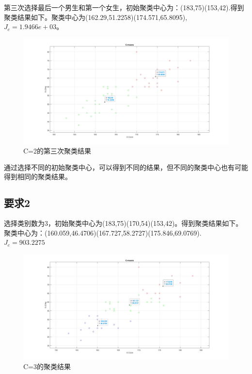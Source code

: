 \documentclass{article}
\begin{document}
第三次选择最后一个男生和第一个女生，初始聚类中心为：(183,75)(153,42).得到聚类结果如下。聚类中心为(162.29,51.2258)(174.571,65.8095),\\$J_e = 1.9466e+03$。

\begin{figure}[H]
    \centering
    \includegraphics[width=1\textwidth]{image/Figure04.jpg}
    \caption{C=2的第三次聚类结果}
    \label{Figure04}
\end{figure}

通过选择不同的初始聚类中心，可以得到不同的结果，但不同的聚类中心也有可能得到相同的聚类结果。
\subsection{要求2}
选择类别数为3，初始聚类中心为(183,75)(170,54)(153,42)。得到聚类结果如下。聚类中心为：(160.059,46.4706)(167.727,58.2727)(175.846,69.0769).\\$J_e = 903.2275$

\begin{figure}[H]
    \centering
    \includegraphics[width=1\textwidth]{image/Figure05.jpg}
    \caption{C=3的聚类结果}
    \label{Figure05}
\end{figure}
\end{document}
